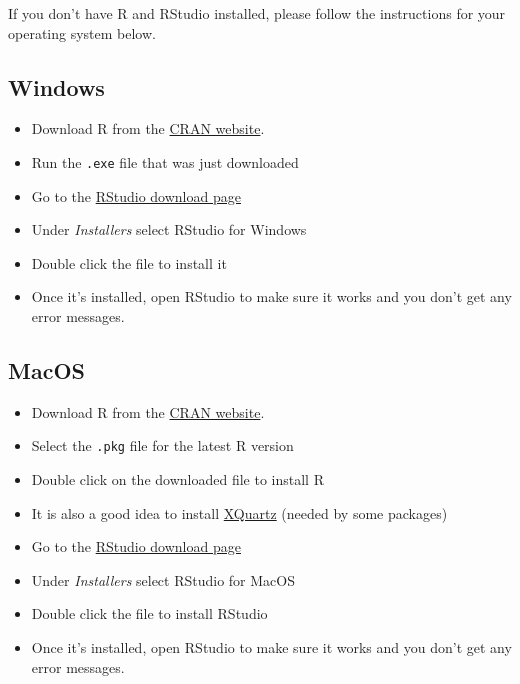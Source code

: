 \documentclass[
]{book}
\providecommand{\tightlist}{%
  \setlength{\itemsep}{0pt}\setlength{\parskip}{0pt}}
\begin{document}
If you don't have R and RStudio installed, please follow the instructions for your operating system below.

\hypertarget{windows}{%
\subsection{Windows}\label{windows}}

\begin{itemize}
\tightlist
\item
  Download R from
  the \href{http://cran.r-project.org/bin/windows/base/release.htm}{CRAN website}.
\item
  Run the \texttt{.exe} file that was just downloaded
\item
  Go to the \href{https://www.rstudio.com/products/rstudio/download/\#download}{RStudio download page}
\item
  Under \emph{Installers} select RStudio for Windows
\item
  Double click the file to install it
\item
  Once it's installed, open RStudio to make sure it works and you don't get any
  error messages.
\end{itemize}

\hypertarget{macos}{%
\subsection{MacOS}\label{macos}}

\begin{itemize}
\tightlist
\item
  Download R from
  the \href{http://cran.r-project.org/bin/macosx}{CRAN website}.
\item
  Select the \texttt{.pkg} file for the latest R version
\item
  Double click on the downloaded file to install R
\item
  It is also a good idea to install \href{https://www.xquartz.org/}{XQuartz} (needed
  by some packages)
\item
  Go to the \href{https://www.rstudio.com/products/rstudio/download/\#download}{RStudio download page}
\item
  Under \emph{Installers} select RStudio for MacOS
\item
  Double click the file to install RStudio
\item
  Once it's installed, open RStudio to make sure it works and you don't get any
  error messages.
\end{itemize}
\end{document}
